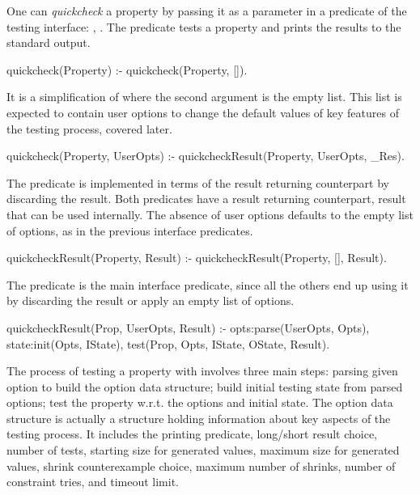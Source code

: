 One can \emph{quickcheck} a property by passing it as a parameter in a
predicate of the \plqc{} testing interface: ,
 .
%
The  predicate tests a property and prints the results
to the standard output.
%
\begin{yapcode}
 quickcheck(Property) :-
   quickcheck(Property, []).
\end{yapcode}
%
It is a simplification of  where the second argument
is the empty list.
%
This list is expected to contain user options to change the default
values of key features of the testing process, covered later.
\begin{yapcode}
 quickcheck(Property, UserOpts)  :-
   quickcheckResult(Property, UserOpts, _Res).
\end{yapcode}
%
The predicate is implemented in terms of the result returning
counterpart by discarding the result.
%
Both  predicates have a result returning counterpart,
result that can be used internally.
%
The absence of user options defaults to the empty list of options, as in
the previous interface predicates.
\begin{yapcode}
 quickcheckResult(Property, Result) :-
   quickcheckResult(Property, [], Result).
\end{yapcode}
The predicate  is the main interface predicate,
since all the others end up using it by discarding the result or apply
an empty list of options.
\begin{yapcode}
 quickcheckResult(Prop, UserOpts, Result) :-
   opts:parse(UserOpts, Opts),
   state:init(Opts, IState),
   test(Prop, Opts, IState, OState, Result).
\end{yapcode}


The process of testing a property with 
involves three main steps: parsing given option to build the option data
structure; build initial testing state from parsed options; test the
property w.r.t. the  options and initial state.
%
The option data structure is actually a structure holding information
about key aspects of the testing process.
%
It includes the printing predicate, long/short result choice, number of
tests, starting size for generated values, maximum size for generated
values, shrink counterexample choice, maximum number of shrinks, number
of constraint tries, and timeout limit.


